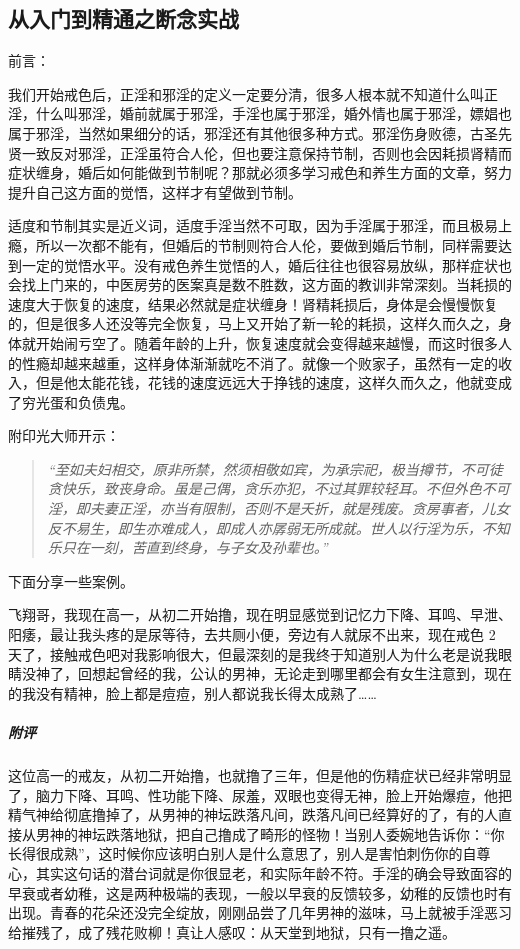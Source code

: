\subsection{从入门到精通之断念实战}

前言：

我们开始戒色后，正淫和邪淫的定义一定要分清，很多人根本就不知道什么叫正淫，什么叫邪淫，婚前就属于邪淫，手淫也属于邪淫，婚外情也属于邪淫，嫖娼也属于邪淫，当然如果细分的话，邪淫还有其他很多种方式。邪淫伤身败德，古圣先贤一致反对邪淫，正淫虽符合人伦，但也要注意保持节制，否则也会因耗损肾精而症状缠身，婚后如何能做到节制呢？那就必须多学习戒色和养生方面的文章，努力提升自己这方面的觉悟，这样才有望做到节制。

适度和节制其实是近义词，适度手淫当然不可取，因为手淫属于邪淫，而且极易上瘾，所以一次都不能有，但婚后的节制则符合人伦，要做到婚后节制，同样需要达到一定的觉悟水平。没有戒色养生觉悟的人，婚后往往也很容易放纵，那样症状也会找上门来的，中医房劳的医案真是数不胜数，这方面的教训非常深刻。当耗损的速度大于恢复的速度，结果必然就是症状缠身！肾精耗损后，身体是会慢慢恢复的，但是很多人还没等完全恢复，马上又开始了新一轮的耗损，这样久而久之，身体就开始闹亏空了。随着年龄的上升，恢复速度就会变得越来越慢，而这时很多人的性瘾却越来越重，这样身体渐渐就吃不消了。就像一个败家子，虽然有一定的收入，但是他太能花钱，花钱的速度远远大于挣钱的速度，这样久而久之，他就变成了穷光蛋和负债鬼。

附印光大师开示：

\begin{quote}\it
    “至如夫妇相交，原非所禁，然须相敬如宾，为承宗祀，极当撙节，不可徒贪快乐，致丧身命。虽是己偶，贪乐亦犯，不过其罪较轻耳。不但外色不可淫，即夫妻正淫，亦当有限制，否则不是夭折，就是残废。贪房事者，儿女反不易生，即生亦难成人，即成人亦孱弱无所成就。世人以行淫为乐，不知乐只在一刻，苦直到终身，与子女及孙辈也。”
\end{quote}

下面分享一些案例。

\begin{case}
    飞翔哥，我现在高一，从初二开始撸，现在明显感觉到记忆力下降、耳鸣、早泄、阳痿，最让我头疼的是尿等待，去共厕小便，旁边有人就尿不出来，现在戒色 2 天了，接触戒色吧对我影响很大，但最深刻的是我终于知道别人为什么老是说我眼睛没神了，回想起曾经的我，公认的男神，无论走到哪里都会有女生注意到，现在的我没有精神，脸上都是痘痘，别人都说我长得太成熟了……
    \subparagraph{附评} 这位高一的戒友，从初二开始撸，也就撸了三年，但是他的伤精症状已经非常明显了，脑力下降、耳鸣、性功能下降、尿羞，双眼也变得无神，脸上开始爆痘，他把精气神给彻底撸掉了，从男神的神坛跌落凡间，跌落凡间已经算好的了，有的人直接从男神的神坛跌落地狱，把自己撸成了畸形的怪物！当别人委婉地告诉你：“你长得很成熟”，这时候你应该明白别人是什么意思了，别人是害怕刺伤你的自尊心，其实这句话的潜台词就是你很显老，和实际年龄不符。手淫的确会导致面容的早衰或者幼稚，这是两种极端的表现，一般以早衰的反馈较多，幼稚的反馈也时有出现。青春的花朵还没完全绽放，刚刚品尝了几年男神的滋味，马上就被手淫恶习给摧残了，成了残花败柳！真让人感叹：从天堂到地狱，只有一撸之遥。
\end{case}

